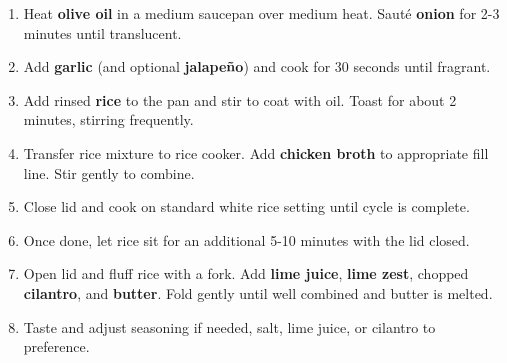 \documentclass[11pt,letterpaper]{article}
\begin{document}
\begin{enumerate}
    \item Heat \textbf{olive oil} in a medium saucepan over medium heat. Sauté \textbf{onion} for 2-3 minutes until translucent.
    \item Add \textbf{garlic} (and optional \textbf{jalapeño}) and cook for 30 seconds until fragrant.
    \item Add rinsed \textbf{rice} to the pan and stir to coat with oil. Toast for about 2 minutes, stirring frequently.
    \item Transfer rice mixture to rice cooker. Add \textbf{chicken broth} to appropriate fill line. Stir gently to combine.
    \item Close lid and cook on standard white rice setting until cycle is complete.
    \item Once done, let rice sit for an additional 5-10 minutes with the lid closed.
    \item Open lid and fluff rice with a fork. Add \textbf{lime juice}, \textbf{lime zest}, chopped \textbf{cilantro}, and \textbf{butter}. Fold gently until well combined and butter is melted.
    \item Taste and adjust seasoning if needed, salt, lime juice, or cilantro to preference.
\end{enumerate}
\end{document}
